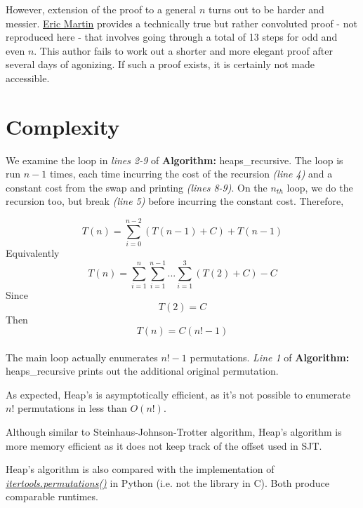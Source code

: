 \documentclass{article}
\begin{document}
However, extension of the proof to a general \(n\) turns out to be harder and messier. \href{https://webcms3.cse.unsw.edu.au/static/uploads/course/COMP9021/15s2/60daa1780a57bd34476ca8f941dc1cd75053842948dd0a658afc414624b52adf/Permutations.pdf}{\underline{Eric Martin}} provides a technically true but rather convoluted proof - not reproduced here - that involves going through a total of 13 steps for odd and even \(n\). This author fails to work out a shorter and more elegant proof after several days of agonizing. If such a proof exists, it is certainly not made accessible. 


\section{Complexity}

We examine the loop in \textit{lines 2-9} of \textbf{Algorithm:} heaps\_recursive. The loop is run \(n-1\) times, each time incurring the cost of the recursion \textit{(line 4)} and a constant cost from the swap and printing \textit{(lines 8-9)}. On the \(n_{th}\) loop, we do the recursion too, but break \textit{(line 5)} before incurring the constant cost. Therefore,

\[T(n)=\sum\limits_{i=0}^{n-2} (T(n-1)+C)+T(n-1)\]
Equivalently
\[T(n)=\sum\limits_{i=1}^n \sum\limits_{i=1}^{n-1} ... \sum\limits_{i=1}^{3} (T(2)+C)-C\]
Since
\[T(2)=C\]
Then
\[T(n)=C(n!-1)\]
\\
The main loop actually enumerates \(n!-1\) permutations. \textit{Line 1} of \textbf{Algorithm:} heaps\_recursive prints out the additional original permutation.

As expected, Heap's is asymptotically efficient, as it's not possible to enumerate \(n!\) permutations in less than \(O(n!)\).

Although similar to Steinhaus-Johnson-Trotter algorithm, Heap’s algorithm is more memory efficient as it does not keep track of the offset used in SJT.

Heap's algorithm is also compared with the implementation of \href{https://docs.python.org/3.5/library/itertools.html#itertools.permutations}{\textit{\underline{itertools.permutations()}}} in Python (i.e. not the library in C). Both produce comparable runtimes.

\end{document}
